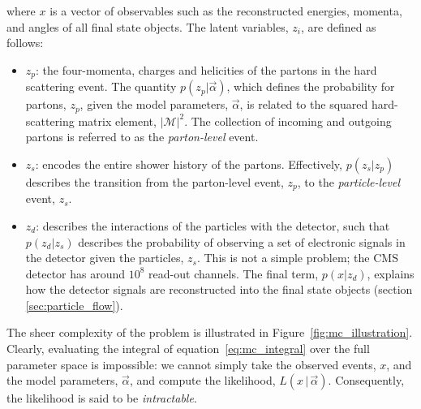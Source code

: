 \noindent
where $x$ is a vector of observables such as the reconstructed energies, momenta, and angles of all final state objects. The latent variables, $z_i$, are defined as follows:
\begin{itemize}
    \item $z_p$: the four-momenta, charges and helicities of the partons in the hard scattering event. The quantity $p(z_p|\vec{\alpha})$, which defines the probability for partons, $z_p$, given the model parameters, $\vec{\alpha}$, is related to the squared hard-scattering matrix element, $|\mathcal{M}|^2$. The collection of incoming and outgoing partons is referred to as the \textit{parton-level} event.
    \item $z_s$: encodes the entire shower history of the partons. Effectively, $p(z_s|z_p)$ describes the transition from the parton-level event, $z_p$, to the \textit{particle-level} event, $z_s$.
    \item $z_d$: describes the interactions of the particles with the detector, such that $p(z_d|z_s)$ describes the probability of observing a set of electronic signals in the detector given the particles, $z_s$. This is not a simple problem; the CMS detector has around $10^8$ read-out channels. The final term, $p(x|z_d)$, explains how the detector signals are reconstructed into the final state objects (section \ref{sec:particle_flow}).
\end{itemize} 

The sheer complexity of the problem is illustrated in Figure~\ref{fig:mc_illustration}. Clearly, evaluating the integral of equation~\ref{eq:mc_integral} over the full parameter space is impossible: we cannot simply take the observed events, $x$, and the model parameters, $\vec{\alpha}$, and compute the likelihood, $L(x\,|\,\vec{\alpha})$. Consequently, the likelihood is said to be \textit{intractable}.

